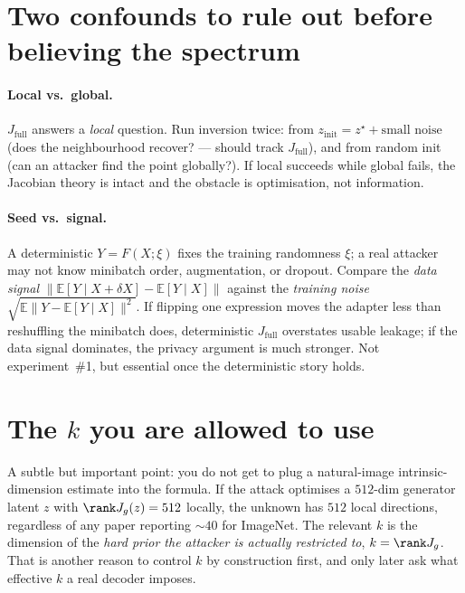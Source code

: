 \section{Two confounds to rule out before believing the spectrum}
\paragraph{Local vs.\ global.} $J_{\mathrm{full}}$ answers a \emph{local} question. Run
inversion twice: from $z_{\mathrm{init}}=z^\star+\text{small noise}$ (does the
neighbourhood recover? --- should track $J_{\mathrm{full}}$), and from random init (can an
attacker find the point globally?). If local succeeds while global fails, the Jacobian
theory is intact and the obstacle is optimisation, not information.
\paragraph{Seed vs.\ signal.} A deterministic $Y=F(X;\xi)$ fixes the training randomness
$\xi$; a real attacker may not know minibatch order, augmentation, or dropout. Compare the
\emph{data signal} $\|\mathbb E[Y\mid X+\delta X]-\mathbb E[Y\mid X]\|$ against the
\emph{training noise} $\sqrt{\mathbb E\|Y-\mathbb E[Y\mid X]\|^2}$. If flipping one
expression moves the adapter less than reshuffling the minibatch does, deterministic
$J_{\mathrm{full}}$ overstates usable leakage; if the data signal dominates, the privacy
argument is much stronger. Not experiment~\#1, but essential once the deterministic story
holds.

\section{The \texorpdfstring{$k$}{k} you are allowed to use}
A subtle but important point: you do not get to plug a natural-image intrinsic-dimension
estimate into the formula. If the attack optimises a $512$-dim generator latent $z$ with
$\rank J_g(z)=512$ locally, the unknown has $512$ local directions, regardless of any
paper reporting $\sim\!40$ for ImageNet. The relevant $k$ is the dimension of the
\emph{hard prior the attacker is actually restricted to}, $k=\rank J_g$. That is another
reason to control $k$ by construction first, and only later ask what effective $k$ a real
decoder imposes.

